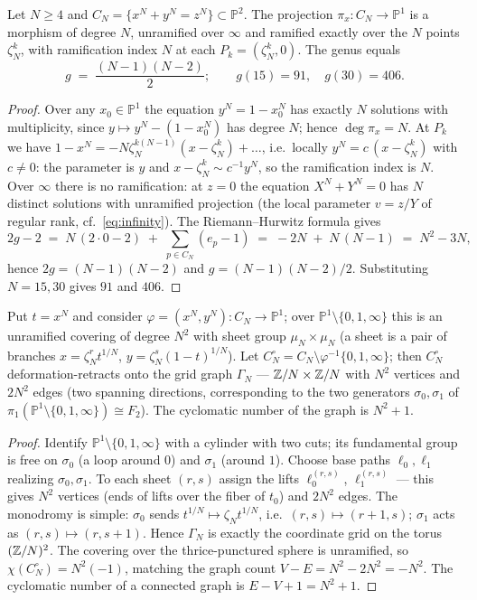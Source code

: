 \begin{lemma}\label{lem:genus}
Let $N\ge 4$ and $C_N=\{x^N+y^N=z^N\}\subset\mathbb{P}^2$. The
projection $\pi_x\colon C_N\to\mathbb{P}^1$ is a morphism of degree
$N$, unramified over $\infty$ and ramified exactly over the $N$
points $\zeta_N^k$, with ramification index $N$ at each
$P_k=(\zeta_N^k,0)$. The genus equals
\[
  g \;=\; \frac{(N-1)(N-2)}{2};
  \qquad
  g(15)=91,\quad g(30)=406 .
\]
\end{lemma}

\begin{proof}
Over any $x_0\in\mathbb{P}^1$ the equation $y^N=1-x_0^N$ has exactly
$N$ solutions with multiplicity, since $y\mapsto y^N-(1-x_0^N)$ has
degree $N$; hence $\deg\pi_x=N$. At $P_k$ we have
$1-x^N=-N\zeta_N^{k(N-1)}(x-\zeta_N^k)+\dots$, i.e.\ locally
$y^N=c\,(x-\zeta_N^k)$ with $c\ne0$: the parameter is $y$ and
$x-\zeta_N^k\sim c^{-1}y^N$, so the ramification index is $N$.
Over $\infty$ there is no ramification: at $z=0$ the equation
$X^N+Y^N=0$ has $N$ distinct solutions with unramified projection
(the local parameter $v=z/Y$ of regular rank, cf.~\eqref{eq:infinity}).
The Riemann--Hurwitz formula gives
\[
  2g-2 \;=\; N\,(2\cdot 0-2) \;+\; \sum_{p\in C_N}(e_p-1)
  \;=\; -2N \;+\; N\,(N-1) \;=\; N^2-3N,
\]
hence $2g=(N-1)(N-2)$ and $g=(N-1)(N-2)/2$. Substituting $N=15,30$
gives $91$ and $406$.
\end{proof}

\begin{lemma}\label{lem:gridgraph}
Put $t=x^N$ and consider $\varphi=(x^N,y^N)\colon C_N\to
\mathbb{P}^1$; over $\mathbb{P}^1\setminus\{0,1,\infty\}$ this is an
unramified covering of degree $N^2$ with sheet group
$\mu_N\times\mu_N$ (a sheet is a pair of branches
$x=\zeta_N^r t^{1/N}$, $y=\zeta_N^s(1-t)^{1/N}$). Let
$C_N^\circ=C_N\setminus\varphi^{-1}\{0,1,\infty\}$; then
$C_N^\circ$ deformation-retracts onto the grid graph $\Gamma_N$
--- $\mathbb{Z}/N\times\mathbb{Z}/N$ with $N^2$ vertices and $2N^2$ edges (two
spanning directions, corresponding to the two generators
$\sigma_0,\sigma_1$ of $\pi_1(\mathbb{P}^1\setminus\{0,1,\infty\})
\cong F_2$). The cyclomatic number of the graph is $N^2+1$.
\end{lemma}

\begin{proof}
Identify $\mathbb{P}^1\setminus\{0,1,\infty\}$ with a cylinder with
two cuts; its fundamental group is free on $\sigma_0$ (a loop around
$0$) and $\sigma_1$ (around $1$). Choose base paths
$\ell_0,\ell_1$ realizing $\sigma_0,\sigma_1$. To each sheet
$(r,s)$ assign the lifts $\ell_0^{(r,s)}$, $\ell_1^{(r,s)}$ ---
this gives $N^2$ vertices (ends of lifts over the fiber of $t_0$)
and $2N^2$ edges. The monodromy is simple: $\sigma_0$ sends
$t^{1/N}\mapsto\zeta_N t^{1/N}$, i.e.\ $(r,s)\mapsto(r+1,s)$;
$\sigma_1$ acts as $(r,s)\mapsto(r,s+1)$. Hence $\Gamma_N$ is
exactly the coordinate grid on the torus $(\mathbb{Z}/N)^2$. The covering
over the thrice-punctured sphere is unramified, so
$\chi(C_N^\circ)=N^2(-1)$, matching the graph count
$V-E=N^2-2N^2=-N^2$. The cyclomatic number of a connected graph is
$E-V+1=N^2+1$.
\end{proof}

